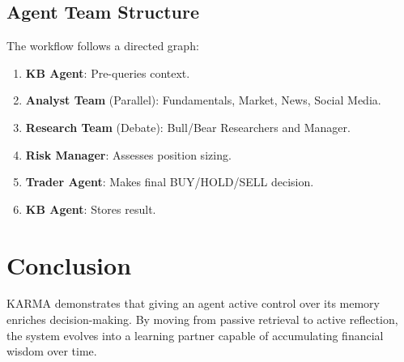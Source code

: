 \documentclass[11pt, a4paper]{article}
\begin{document}
\subsection{Agent Team Structure}
The workflow follows a directed graph:
\begin{enumerate}
    \item \textbf{KB Agent}: Pre-queries context.
    \item \textbf{Analyst Team} (Parallel): Fundamentals, Market, News, Social Media.
    \item \textbf{Research Team} (Debate): Bull/Bear Researchers and Manager.
    \item \textbf{Risk Manager}: Assesses position sizing.
    \item \textbf{Trader Agent}: Makes final BUY/HOLD/SELL decision.
    \item \textbf{KB Agent}: Stores result.
\end{enumerate}

\section{Conclusion}
KARMA demonstrates that giving an agent active control over its memory enriches decision-making. By moving from passive retrieval to active reflection, the system evolves into a learning partner capable of accumulating financial wisdom over time.
\end{document}
